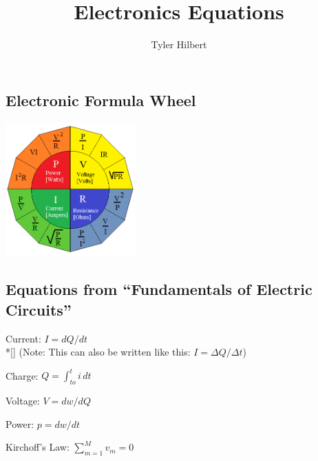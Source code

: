 \documentclass{article}
\newcommand{\forceindent}{\leavevmode{\parindent=3em\indent}}
\begin{document}
	\title{Electronics Equations}
	\author{Tyler Hilbert}
	\date{}
	\maketitle

	\subsection*{Electronic Formula Wheel}
	\includegraphics[width=50mm]{FormulaWheel.png}

	\subsection*{Equations from ``Fundamentals of Electric Circuits''}

	Current: $I = dQ/dt$ \\*[\smallskipamount]
	\forceindent (Note: This can also be written like this: $I = \Delta Q / \Delta t$)
	
	Charge: $Q = \int_{to}^{t} i\,dt$

	Voltage: $V = dw/dQ$

	Power: $p = dw/dt$
	
	Kirchoff's Law: $\sum\limits_{m=1}^{M} v_{m} = 0$ %
	
\end{document}
